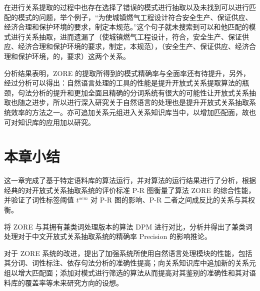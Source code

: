 在进行关系提取的过程中也存在选择了错误的模式进行抽取以及未找到可以进行匹配的模式的问题，举个例子，“为使城镇燃气工程设计符合安全生产、保证供应、经济合理和保护环境的要求，制定本规范。”这个句子就未搜索到可以和他匹配的模式进行关系抽取，进而遗漏了（使城镇燃气工程设计，符合，安全生产、保证供应、经济合理和保护环境的要求，制定，本规范），（安全生产、保证供应、经济合理和保护环境，的，要求）这两个关系。

分析结果表明，ZORE 的提取所得到的模式精确率与全面率还有待提升，另外，经过分析可以得出：自然语言处理的工具的性能是提升开放式关系提取算法的瓶颈，句法分析的提升和更加全面且精确的分词系统有很大的可能性让开放式关系抽取也随之进步，所以进行深入研究关于自然语言的处理也是提升开放式关系抽取系统效率的方法之一。亦可追加关系元组进入关系知识库当中，以增加匹配面，故也可对知识库的应用加以研究。

\section{本章小结}
这一章完成了基于特定语料库的算法运行，并对算法的运行结果进行了分析，根据经典的对开放式关系抽取系统的评价标准 P-R 图衡量了算法 ZORE 的综合性能，并验证了词性标签阈值 $t^{sem}$ 对 P-R 图的影响、P-R 二者之间成反比的关系与其权衡。

将 ZORE 与其拥有兼类词处理版本的算法 DPM 进行对比，分析并得出了兼类词处理对于中文开放式关系抽取系统的精确率 Precision 的影响推论。

对于 ZORE 系统的改进，提出了加强系统所使用自然语言处理模块的性能，包括其分词、词性标注、依存句法分析的准确性提高；向关系知识库中追加新的关系元组以增大匹配面；添加对模式进行筛选的算法从而提高对其鉴别的准确性和其对语料库的覆盖率等未来研究方向的设想。